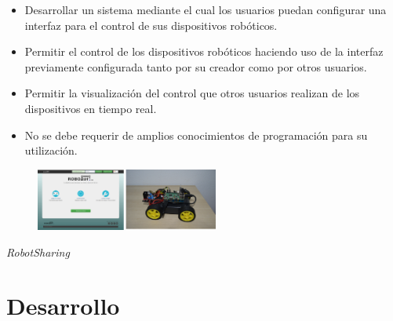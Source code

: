 \documentclass[xcolor=x11names,compress]{beamer}
\theoremstyle{cuadrado}
\begin{document}
{{\begin{itemize}
 \item Desarrollar un sistema mediante el cual los usuarios puedan configurar una interfaz para el control de sus dispositivos robóticos.
 \item Permitir el control de los dispositivos robóticos haciendo uso de la interfaz previamente configurada tanto por su creador como por otros usuarios.
 \item Permitir la visualización del control que otros usuarios realizan de los dispositivos en tiempo real.
 \item No se debe requerir de amplios conocimientos de programación para su utilización.
\end{itemize}

\begin{figure}[H]
\includegraphics[width=6cm]{objetivos.png}
\end{figure}

\begin{center}
 \fontsize{20pt}{12pt}\selectfont
 \emph{RobotSharing}
\end{center}

}


\section{Desarrollo}

}
\end{document}
